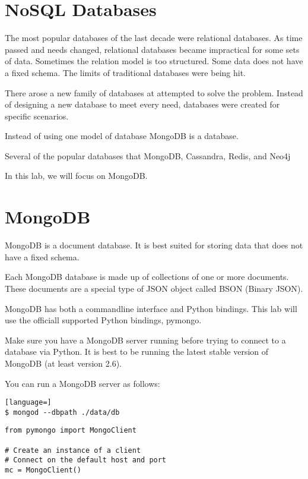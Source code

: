 \label{lab:mongodb}

\section*{NoSQL Databases}
The most popular databases of the last decade were relational databases.
As time passed and needs changed, relational databases became impractical for some sets of data.
Sometimes the relation model is too structured.
Some data does not have a fixed schema.
The limits of traditional databases were being hit.

There arose a new family of databases at attempted to solve the problem.
Instead of designing a new database to meet every need, databases were created for specific scenarios.

Instead of using one model of database
MongoDB is a database.

Several of the popular databases that MongoDB, Cassandra, Redis, and Neo4j

In this lab, we will focus on MongoDB.

\section*{MongoDB}
MongoDB is a document database.
It is best suited for storing data that does not have a fixed schema.

Each MongoDB database is made up of collections of one or more documents.
These documents are a special type of JSON object called BSON (Binary JSON).

MongoDB has both a commandline interface and Python bindings.
This lab will use the officiall supported Python bindings, pymongo.


\begin{info}
Make sure you have a MongoDB server running before trying to connect to a database via Python.
It is best to be running the latest stable version of MongoDB (at least version 2.6).
\end{info}

You can run a MongoDB server as follows:
\begin{lstlisting}[language=]
$ mongod --dbpath ./data/db
\end{lstlisting}

\begin{lstlisting}
from pymongo import MongoClient

# Create an instance of a client
# Connect on the default host and port
mc = MongoClient()
\end{lstlisting}


